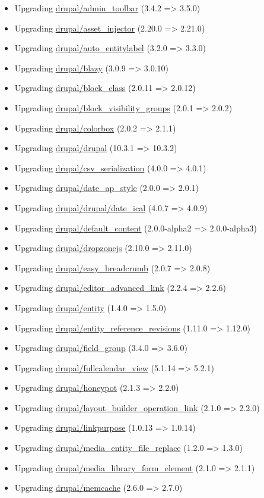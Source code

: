 \documentclass[letterpaper, 12pt, final]{article}
\newcommand{\module}[1]{\href{https://drupal.org/project/#1}{drupal/{#1}}}
\begin{document}
\begin{itemize}
    \item Upgrading \module{admin\_toolbar} (3.4.2 => 3.5.0)
    \item Upgrading \module{asset\_injector} (2.20.0 => 2.21.0)
    \item Upgrading \module{auto\_entitylabel} (3.2.0 => 3.3.0)
    \item Upgrading \module{blazy} (3.0.9 => 3.0.10)
    \item Upgrading \module{block\_class} (2.0.11 => 2.0.12)
    \item Upgrading \module{block\_visibility\_groups} (2.0.1 => 2.0.2)
    \item Upgrading \module{colorbox} (2.0.2 => 2.1.1)
    \item Upgrading \module{drupal} (10.3.1 => 10.3.2)
    \item Upgrading \module{csv\_serialization} (4.0.0 => 4.0.1)
    \item Upgrading \module{date\_ap\_style} (2.0.0 => 2.0.1)
    \item Upgrading \module{drupal/date\_ical} (4.0.7 => 4.0.9)
    \item Upgrading \module{default\_content} (2.0.0-alpha2 => 2.0.0-alpha3)
    \item Upgrading \module{dropzonejs} (2.10.0 => 2.11.0)
    \item Upgrading \module{easy\_breadcrumb} (2.0.7 => 2.0.8)
    \item Upgrading \module{editor\_advanced\_link} (2.2.4 => 2.2.6)
    \item Upgrading \module{entity} (1.4.0 => 1.5.0)
    \item Upgrading \module{entity\_reference\_revisions} (1.11.0 => 1.12.0)
    \item Upgrading \module{field\_group} (3.4.0 => 3.6.0)
    \item Upgrading \module{fullcalendar\_view} (5.1.14 => 5.2.1)
    \item Upgrading \module{honeypot} (2.1.3 => 2.2.0)
    \item Upgrading \module{layout\_builder\_operation\_link} (2.1.0 => 2.2.0)
    \item Upgrading \module{linkpurpose} (1.0.13 => 1.0.14)
    \item Upgrading \module{media\_entity\_file\_replace} (1.2.0 => 1.3.0)
    \item Upgrading \module{media\_library\_form\_element} (2.1.0 => 2.1.1)
    \item Upgrading \module{memcache} (2.6.0 => 2.7.0)

\end{itemize}
\end{document}
